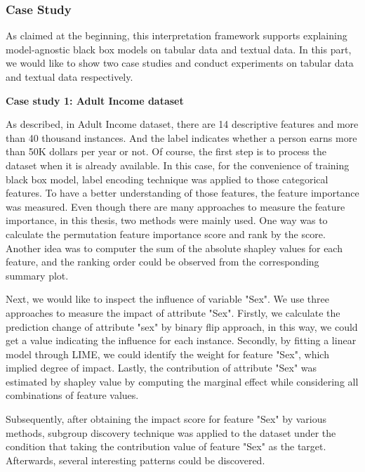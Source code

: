 \subsubsection{Case Study}

As claimed at the beginning, this interpretation framework supports explaining model-agnostic black box models on tabular data and textual data. In this part, we would like to show two case studies and conduct experiments on tabular data and textual data respectively. 

\textbf{Case study 1: Adult Income dataset}

As described, in Adult Income dataset, there are 14 descriptive features and more than 40 thousand instances. And the label indicates whether a person earns more than 50K dollars per year or not. Of course, the first step is to process the dataset when it is already available. In this case, for the convenience of training black box model, label encoding technique was applied to those categorical features. To have a better understanding of those features, the feature importance was measured. Even though there are many approaches to measure the feature importance, in this thesis, two methods were mainly used. One way was to calculate the permutation feature importance score and rank by the score. Another idea was to computer the sum of the absolute shapley values for each feature, and the ranking order could be observed from the corresponding summary plot. 

Next, we would like to inspect the influence of variable "Sex". We use three approaches to measure the impact of attribute "Sex". Firstly, we calculate the prediction change of attribute "sex" by binary flip approach, in this way, we could get a value indicating the influence for each instance. Secondly, by fitting a linear model through LIME, we could identify the weight for feature "Sex", which implied degree of impact. Lastly, the contribution of attribute "Sex" was estimated by shapley value by computing the marginal effect while considering all combinations of feature values. 

Subsequently, after obtaining the impact score for feature "Sex" by various methods, subgroup discovery technique was applied to the dataset under the condition that taking the contribution value of feature "Sex" as the target. Afterwards, several interesting patterns could be discovered. 


